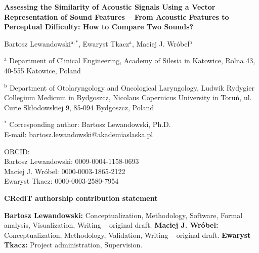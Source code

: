 \documentclass[11pt]{article}
\begin{document}
\begin{center}
{\Large\bfseries Assessing the Similarity of Acoustic Signals Using a Vector Representation of Sound Features -- From Acoustic Features to Perceptual Difficulty: How to Compare Two Sounds?\par}

\vspace{1.5em}
{\large Bartosz Lewandowski$^{\mathrm{a},*}$, Ewaryst Tkacz$^{\mathrm{a}}$, Maciej J. Wróbel$^{\mathrm{b}}$\par}
\end{center}

\vspace{1em}
\noindent$^{\mathrm{a}}$ Department of Clinical Engineering, Academy of Silesia in Katowice, Rolna 43, 40-555 Katowice, Poland

\noindent$^{\mathrm{b}}$ Department of Otolaryngology and Oncological Laryngology, Ludwik Rydygier Collegium Medicum in Bydgoszcz, Nicolaus Copernicus University in Toruń, ul. Curie Skłodowskiej 9, 85-094 Bydgoszcz, Poland

\vspace{1.5em}
\noindent$^{*}$ Corresponding author: Bartosz Lewandowski, Ph.D.\\
E-mail: bartosz.lewandowski@akademiaslaska.pl

\vspace{1.5em}
\noindent ORCID:\\
Bartosz Lewandowski: 0009-0004-1158-0693\\
Maciej J. Wróbel: 0000-0003-1865-2122\\
Ewaryst Tkacz: 0000-0003-2580-7954

\vspace{1.5em}\noindent\textbf{CRediT authorship contribution statement}\par
\textbf{Bartosz Lewandowski:} Conceptualization, Methodology, Software, Formal analysis, Visualization, Writing – original draft.
\textbf{Maciej J. Wróbel:} Conceptualization, Methodology, Validation, Writing – original draft.
\textbf{Ewaryst Tkacz:} Project administration, Supervision.
\end{document}
